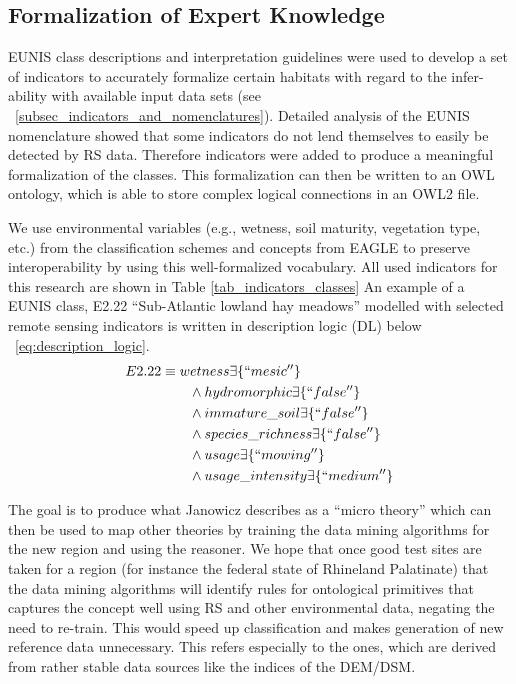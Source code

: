 \documentclass[authoryear, review,12pt,number]{elsarticle}
\begin{document}
\subsection{Formalization of Expert Knowledge}
EUNIS class descriptions and interpretation guidelines \citep{EUNISManual} were
used to develop a set of indicators to accurately formalize certain habitats
with regard to the infer-ability with available input data sets (see
~\ref{subsec_indicators_and_nomenclatures}). Detailed analysis of the EUNIS
nomenclature showed that some indicators do not lend themselves to easily be
detected by RS data. Therefore indicators were added to produce a meaningful
formalization of the classes.  This formalization can then be written to an OWL
ontology, which is able to store complex logical connections in an OWL2 file. 


We use environmental variables (e.g., wetness, soil maturity, vegetation type,
etc.) from the classification schemes and concepts from EAGLE to preserve
interoperability by using this well-formalized vocabulary. All used indicators
for this research are shown in Table \ref{tab_indicators_classes} An example of
a EUNIS class, E2.22 ``Sub-Atlantic lowland hay meadows'' modelled with selected
remote sensing indicators is written in description logic (DL) below
~\ref{eq:description_logic}.
\begin{equation}
\begin{align*}
E2.22 &\equiv wetness \exists \{``mesic''\} \\
&\qquad {} \land hydromorphic \exists \{``false''\} \\
&\qquad {} \land immature\_soil \exists \{``false''\} \\
&\qquad {} \land species\_richness \exists \{``false''\} \\
&\qquad {} \land usage \exists \{``mowing''\} \\
&\qquad {} \land usage\_intensity \exists \{``medium''\} \\
\end{align*}
\label{eq:description_logic}
\end{equation}


The goal is to produce what Janowicz describes as a
``micro theory'' \citep{Janowicz2012} which can then be used to map other theories
by training the data mining algorithms for the new region and using the
reasoner. We hope that once good test sites are taken for a region (for instance
the federal state of Rhineland Palatinate) that the data mining algorithms will
identify rules for ontological primitives that captures the concept well using
RS and other environmental data, negating the need to re-train. This would speed
up classification and makes generation of new reference data unnecessary. This
refers especially to the ones, which are derived from rather stable data sources
like the indices of the DEM/DSM.
\end{document}
